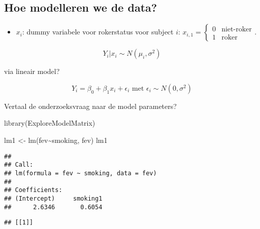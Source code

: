 \documentclass[
]{article}
\newenvironment{Shaded}{\begin{snugshade}}{\end{snugshade}}
\newcommand{\AttributeTok}[1]{\textcolor[rgb]{0.77,0.63,0.00}{#1}}
\newcommand{\FunctionTok}[1]{\textcolor[rgb]{0.00,0.00,0.00}{#1}}
\newcommand{\NormalTok}[1]{#1}
\newcommand{\OtherTok}[1]{\textcolor[rgb]{0.56,0.35,0.01}{#1}}
\newcommand{\SpecialCharTok}[1]{\textcolor[rgb]{0.00,0.00,0.00}{#1}}
\providecommand{\tightlist}{%
  \setlength{\itemsep}{0pt}\setlength{\parskip}{0pt}}
\begin{document}
\hypertarget{hoe-modelleren-we-de-data}{%
\subsection{Hoe modelleren we de
data?}\label{hoe-modelleren-we-de-data}}

\begin{itemize}
\tightlist
\item
  \(x_i\): dummy variabele voor rokerstatus voor subject \(i\):
  \(x_{i,1}=\begin{cases} 0& \text{niet-roker}\\ 1& \text{roker} \end{cases}\).
\end{itemize}

\[Y_i\vert x_i\sim N(\mu_i,\sigma^2)\]

via lineair model?

\[Y_i = \beta_0 + \beta_1 x_i + \epsilon_i \text{ met } \epsilon_i\sim N(0,\sigma^2)\]

Vertaal de onderzoeksvraag naar de model parameters?

\begin{Shaded}
\begin{Highlighting}[]
\FunctionTok{library}\NormalTok{(ExploreModelMatrix)}

\NormalTok{lm1 }\OtherTok{\textless{}{-}} \FunctionTok{lm}\NormalTok{(fev}\SpecialCharTok{\textasciitilde{}}\NormalTok{smoking, fev)}
\NormalTok{lm1 }
\end{Highlighting}
\end{Shaded}

\begin{verbatim}
## 
## Call:
## lm(formula = fev ~ smoking, data = fev)
## 
## Coefficients:
## (Intercept)     smoking1  
##      2.6346       0.6054
\end{verbatim}

\begin{Shaded}
\end{Shaded}

\begin{verbatim}
## [[1]]
\end{verbatim}
\end{document}
